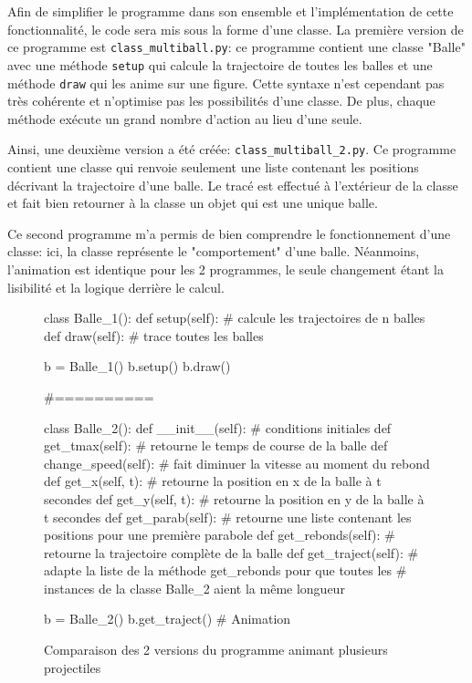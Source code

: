 \documentclass[a4paper,11pt]{article}
\begin{document}
Afin de simplifier le programme dans son ensemble et l'implémentation de cette fonctionnalité, le code sera mis sous la forme d'une classe. La première version de ce programme est  \verb|class_multiball.py|: ce programme contient une classe "Balle" avec une méthode \verb|setup| qui calcule la trajectoire de toutes les balles et une méthode \verb|draw| qui les anime sur une figure. Cette syntaxe n'est cependant pas très cohérente et n'optimise pas les possibilités d'une classe. De plus, chaque méthode exécute un grand nombre d'action au lieu d'une seule.

Ainsi, une deuxième version a été créée: \verb|class_multiball_2.py|. Ce programme contient une classe qui renvoie seulement une liste contenant les positions décrivant la trajectoire d'une balle. Le tracé est effectué à l'extérieur de la classe et fait bien retourner à la classe un objet qui est une unique balle.

Ce second programme m'a permis de bien comprendre le fonctionnement d'une classe: ici, la classe représente le "comportement" d'une balle. Néanmoins, l'animation est identique pour les 2 programmes, le seule changement étant la lisibilité et la logique derrière le calcul.


\begin{figure}
\centering

\begin{python}
class Balle_1():
    def setup(self):
        # calcule les trajectoires de n balles
    def draw(self):
        # trace toutes les balles

b = Balle_1()
b.setup()
b.draw()

#==========

class Balle_2():
    def __init__(self):
        # conditions initiales
    def get_tmax(self):
        # retourne le temps de course de la balle
    def change_speed(self): 
        # fait diminuer la vitesse au moment du rebond
    def get_x(self, t):  
        # retourne la position en x de la balle à t secondes
    def get_y(self, t):  
        # retourne la position en y de la balle à t secondes
    def get_parab(self): 
        # retourne une liste contenant les positions pour une première parabole
    def get_rebonds(self):  
        # retourne la trajectoire complète de la balle
    def get_traject(self):
        # adapte la liste de la méthode get_rebonds pour que toutes les 
        # instances de la classe Balle_2 aient la même longueur

b = Balle_2()
b.get_traject()
# Animation 
\end{python}
\caption{Comparaison des 2 versions du programme animant plusieurs projectiles}
\end{figure}
\end{document}

